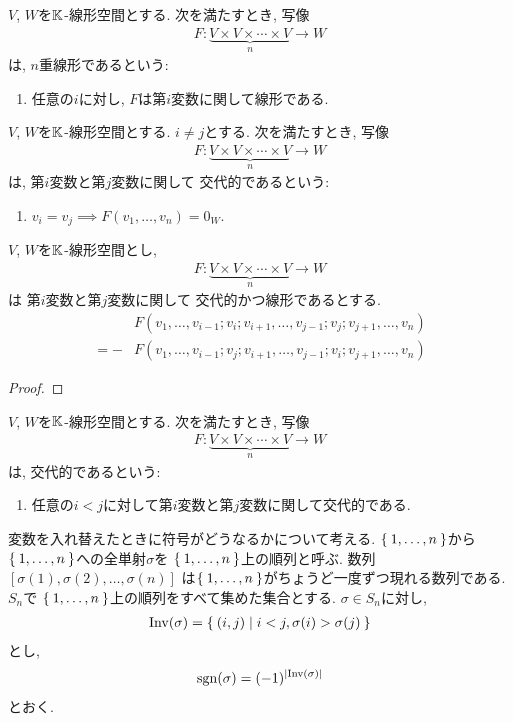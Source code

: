 \begin{definition}
  $V$, $W$を$\mathbb{K}$-線形空間とする.
  次を満たすとき,
  写像
  \begin{align*}
    F\colon \underbrace{V\times V\times \cdots \times V}_n\to W
  \end{align*}
  は,
  $n$重線形であるという:
  \begin{enumerate}
  \item 任意の$i$に対し, $F$は第$i$変数に関して線形である.
  \end{enumerate}
\end{definition}

\begin{definition}
  $V$, $W$を$\mathbb{K}$-線形空間とする.
  $i\neq j$とする.
  次を満たすとき,
  写像
  \begin{align*}
    F\colon \underbrace{V\times V\times \cdots \times V}_n\to W
  \end{align*}
  は,
  第$i$変数と第$j$変数に関して
  交代的であるという:
  \begin{enumerate}
      \item $v_i=v_j\implies F(v_1,\ldots,v_n)=0_W$.
  \end{enumerate}
\end{definition}
\begin{prop}
  $V$, $W$を$\mathbb{K}$-線形空間とし,
  \begin{align*}
    F\colon \underbrace{V\times V\times \cdots \times V}_n\to W
  \end{align*}
  は
  第$i$変数と第$j$変数に関して
  交代的かつ線形であるとする.
  \begin{align*}
    &F(v_1,\ldots,v_{i-1};v_i;v_{i+1},\ldots,v_{j-1};v_j;v_{j+1},\ldots,v_n)\\
    =
    -&
F(v_1,\ldots,v_{i-1};v_j;v_{i+1},\ldots,v_{j-1};v_i;v_{j+1},\ldots,v_n)
  \end{align*}
\end{prop}
\begin{proof}\end{proof}
\begin{definition}
  $V$, $W$を$\mathbb{K}$-線形空間とする.
  次を満たすとき,
  写像
  \begin{align*}
    F\colon \underbrace{V\times V\times \cdots \times V}_n\to W
  \end{align*}
  は,
  交代的であるという:
  \begin{enumerate}
  \item
    任意の$i<j$に対して第$i$変数と第$j$変数に関して交代的である.
  \end{enumerate}
\end{definition}
変数を入れ替えたときに符号がどうなるかについて考える.
$\Set{1,\ldots,n}$から$\Set{1,\ldots,n}$への全単射$\sigma$を
$\Set{1,\ldots,n}$上の順列と呼ぶ.
数列$[\sigma(1),\sigma(2),\ldots,\sigma(n)]$
は$\Set{1,\ldots,n}$がちょうど一度ずつ現れる数列である.
$S_n$で
$\Set{1,\ldots,n}$上の順列をすべて集めた集合とする.
$\sigma\in S_n$に対し,
\begin{align*}
  \operatorname{Inv}(\sigma)=\Set{(i,j)|i<j,\sigma(i)>\sigma(j)}
\end{align*}
とし,
\begin{align*}
 \operatorname{sgn}(\sigma) =(-1)^{\left|\operatorname{Inv}(\sigma)\right|}
\end{align*}
とおく.

